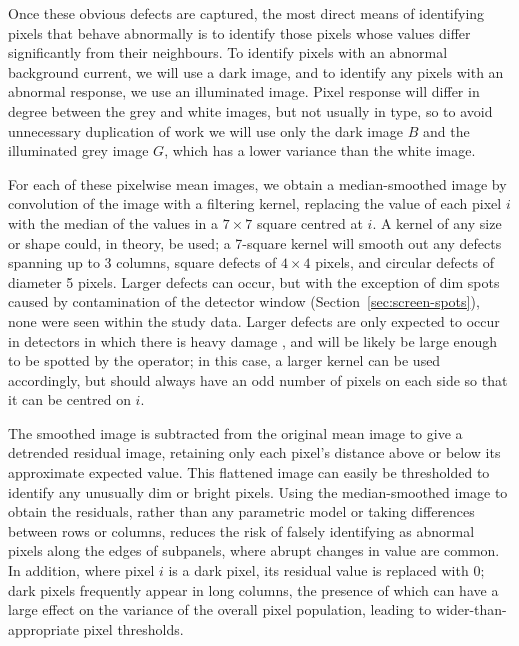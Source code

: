 \documentclass[\main/IO-Pixels.tex]{subfiles}
\begin{document}
Once these obvious defects are captured, the most direct means of identifying pixels that behave abnormally is to identify those pixels whose values differ significantly from their neighbours. To identify pixels with an abnormal background current, we will use a dark image, and to identify any pixels with an abnormal response, we use an illuminated image. Pixel response will differ in degree between the grey and white images, but not usually in type, so to avoid unnecessary duplication of work we will use only the dark image $B$ and the illuminated grey image $G$, which has a lower variance than the white image.

For each of these pixelwise mean images, we obtain a median-smoothed image by convolution of the image with a filtering kernel, replacing the value of each pixel $i$ with the median of the values in a $7 \times 7$ square centred at $i$. A kernel of any size or shape could, in theory, be used; a 7-square kernel will smooth out any defects spanning up to 3 columns, square defects of $4 \times 4$ pixels, and circular defects of diameter 5 pixels. Larger defects can occur, but with the exception of dim spots caused by contamination of the detector window (Section~\ref{sec:screen-spots}), none were seen  within the study data. Larger defects are only expected to occur in detectors in which there is heavy damage , and will be likely be large enough to be spotted by the operator; in this case, a larger kernel can be used accordingly, but should always have an odd number of pixels on each side so that it can be centred on $i$.

The smoothed image is subtracted from the original mean image to give a detrended residual image, retaining only each pixel's distance above or below its approximate expected value. This flattened image can easily be thresholded to identify any unusually dim or bright pixels. Using the median-smoothed image to obtain the residuals, rather than any parametric model or taking differences between rows or columns, reduces the risk of falsely identifying as abnormal pixels along the edges of subpanels, where abrupt changes in value are common. In addition, where pixel $i$ is a dark pixel, its residual value is replaced with 0; dark pixels frequently appear in long columns, the presence of which can have a large effect on the variance of the overall pixel population, leading to wider-than-appropriate pixel thresholds.
\end{document}
